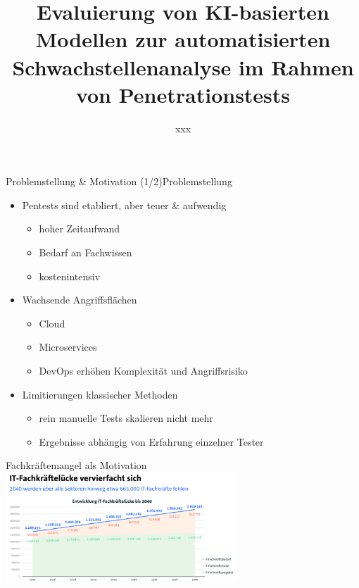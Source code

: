 \documentclass[
	aspectratio=169,	%
	onlytextwidth,		%
	t,					%
	]{beamer}
\title{Evaluierung von KI-basierten Modellen zur automatisierten Schwachstellenanalyse im Rahmen von Penetrationstests}
\author[xxx]{xxx}
\begin{document}
\begin{frame}[fragile]{Problemstellung \& Motivation (1/2)}{Problemstellung}
	\begin{itemize}
		\item Pentests sind etabliert, aber teuer \& aufwendig  
		\begin{itemize}
			\item hoher Zeitaufwand
			\item Bedarf an Fachwissen
			\item kostenintensiv
		\end{itemize}
		
		\item Wachsende Angriffsflächen  
		\begin{itemize}
			\item Cloud
			\item Microservices
			\item DevOps erhöhen Komplexität und Angriffsrisiko
		\end{itemize}
		
		\item Limitierungen klassischer Methoden  
		\begin{itemize}
			\item rein manuelle Tests skalieren nicht mehr
			\item Ergebnisse abhängig von Erfahrung einzelner Tester
		\end{itemize}
	\end{itemize}
\end{frame}




\begin{frame}{Fachkräftemangel als Motivation}
	\centering
	\includegraphics[width=0.65\textwidth]{figures/1.png}
	\label{fig:bitkom}
\end{frame}
\end{document}
